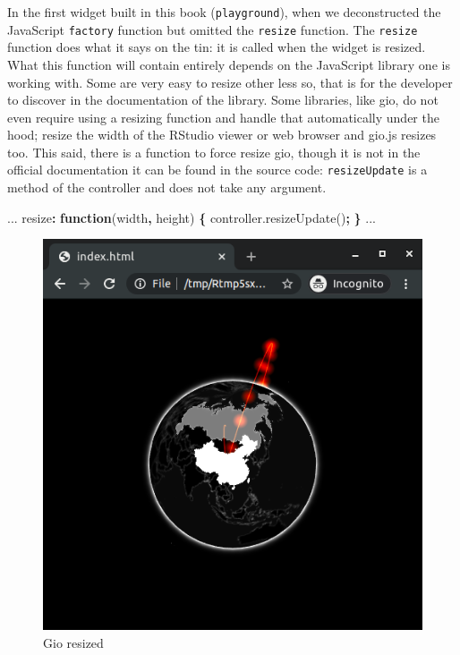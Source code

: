 \documentclass[
]{krantz}
\makeatletter
\newenvironment{Shaded}{\begin{snugshade}}{\end{snugshade}}
\newcommand{\AttributeTok}[1]{\textcolor[rgb]{0.61,0.61,0.61}{#1}}
\newcommand{\KeywordTok}[1]{\textcolor[rgb]{0.27,0.27,0.27}{\textbf{#1}}}
\newcommand{\NormalTok}[1]{#1}
\newcommand{\OperatorTok}[1]{\textcolor[rgb]{0.43,0.43,0.43}{\textbf{#1}}}
\newcommand{\VariableTok}[1]{\textcolor[rgb]{0,0,0}{#1}}
\newenvironment{kframe}{%
\medskip{}
\setlength{\fboxsep}{.8em}
 \def\at@end@of@kframe{}%
 \ifinner\ifhmode%
  \def\at@end@of@kframe{\end{minipage}}%
  \begin{minipage}{\columnwidth}%
 \fi\fi%
 \def\FrameCommand##1{\hskip\@totalleftmargin \hskip-\fboxsep
 \colorbox{shadecolor}{##1}\hskip-\fboxsep
     \hskip-\linewidth \hskip-\@totalleftmargin \hskip\columnwidth}%
 \MakeFramed {\advance\hsize-\width
   \@totalleftmargin\z@ \linewidth\hsize
   \@setminipage}}%
 {\par\unskip\endMakeFramed%
 \at@end@of@kframe}
\renewenvironment{Shaded}{\begin{kframe}}{\end{kframe}}
\makeatother
\begin{document}
In the first widget built in this book (\texttt{playground}), when we deconstructed the JavaScript \texttt{factory} function but omitted the \texttt{resize} function. The \texttt{resize} function does what it says on the tin: it is called when the widget is resized. What this function will contain entirely depends on the JavaScript library one is working with. Some are very easy to resize other less so, that is for the developer to discover in the documentation of the library. Some libraries, like gio, do not even require using a resizing function and handle that automatically under the hood; resize the width of the RStudio viewer or web browser and gio.js resizes too. This said, there is a function to force resize gio, though it is not in the official documentation it can be found in the source code: \texttt{resizeUpdate} is a method of the controller and does not take any argument.

\begin{Shaded}
\begin{Highlighting}[]
\NormalTok{...}
\NormalTok{resize}\OperatorTok{:} \KeywordTok{function}\NormalTok{(width}\OperatorTok{,}\NormalTok{ height) }\OperatorTok{\{}
  \VariableTok{controller}\NormalTok{.}\AttributeTok{resizeUpdate}\NormalTok{()}\OperatorTok{;}
\OperatorTok{\}}
\NormalTok{...}
\end{Highlighting}
\end{Shaded}

\begin{figure}
\centering
\includegraphics{images/gio-small.png}
\caption{Gio resized}
\end{figure}
\end{document}
